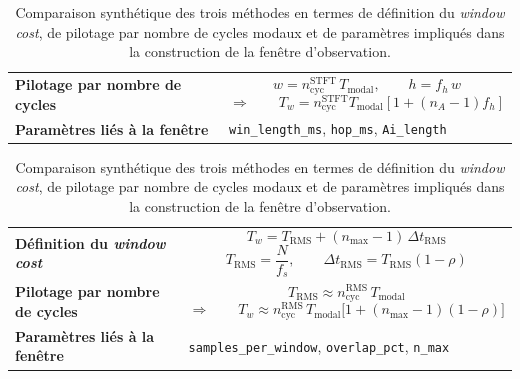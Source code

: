 \documentclass[12pt,a4paper, openany]{book}
\begin{document}
\begin{table}[htbp]
\begin{tcolorbox}
\begin{tcolorbox}
\begin{tabular}{>{\raggedright\arraybackslash\bfseries}p{3.7cm}
                >{\raggedright\arraybackslash}p{10.5cm}}
Pilotage par nombre de cycles &
\[
w=n_{\mathrm{cyc}}^{\mathrm{STFT}}\,T_{\mathrm{modal}},
\qquad
h=f_h\,w
\]
\[
\Rightarrow \qquad
T_w=
n_{\mathrm{cyc}}^{\mathrm{STFT}}T_{\mathrm{modal}}
\left[1+(n_A-1)f_h\right]
\]
\\[0.4em]

Paramètres liés à la fenêtre &
\texttt{win\_length\_ms}, \texttt{hop\_ms}, \texttt{Ai\_length}
\end{tabular}
\end{tcolorbox}

\vspace{0.6em}

\begin{tcolorbox}[
    enhanced,
    colback=azul1b,
    colframe=azul2,
    coltitle=white,
    colbacktitle=azul2,
    title={RMS--CV},
    fonttitle=\normalfont\bfseries,
    arc=1.5mm,
    boxrule=0.7pt,
    width=\textwidth
]
\begin{tabular}{>{\raggedright\arraybackslash\bfseries}p{3.7cm}
                >{\raggedright\arraybackslash}p{10.5cm}}
Définition du \textit{window cost} &
\[
T_w = T_{\mathrm{RMS}} + (n_{\max}-1)\,\Delta t_{\mathrm{RMS}}
\]
\[
T_{\mathrm{RMS}}=\frac{N}{f_s},
\qquad
\Delta t_{\mathrm{RMS}} = T_{\mathrm{RMS}}(1-\rho)
\]
\\[0.4em]

Pilotage par nombre de cycles &
\[
T_{\mathrm{RMS}} \approx n_{\mathrm{cyc}}^{\mathrm{RMS}}\,T_{\mathrm{modal}}
\]
\[
\Rightarrow \qquad
T_w \approx
n_{\mathrm{cyc}}^{\mathrm{RMS}}\,T_{\mathrm{modal}}
\bigl[1+(n_{\max}-1)(1-\rho)\bigr]
\]
\\[0.4em]

Paramètres liés à la fenêtre &
\texttt{samples\_per\_window}, \texttt{overlap\_pct}, \texttt{n\_max}
\end{tabular}
\end{tcolorbox}

\end{tcolorbox}

\caption{Comparaison synthétique des trois méthodes en termes de définition du \textit{window cost}, de pilotage par nombre de cycles modaux et de paramètres impliqués dans la construction de la fenêtre d'observation.}
\label{tab:window_cost_summary_visual}
\end{table}

\newpage


\end{document}
